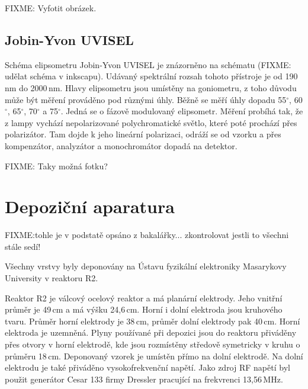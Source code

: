 FIXME: Vyfotit obrázek.


\subsection{Jobin-Yvon UVISEL}
Schéma elipsometru Jobin-Yvon UVISEL je znázorněno na schématu (FIXME: udělat schéma v inkscapu). Udávaný spektrální rozsah tohoto přístroje je od 190\,nm do 2000\,nm. Hlavy elipsometru jsou umístěny na goniometru, z toho důvodu může být měření prováděno pod různými úhly. Běžně se měří úhly dopadu 55$^\circ$, 60$^\circ$, 65$^\circ$, 70$^\circ$ a 75$^\circ$. Jedná se o fázově modulovaný elipsometr. Měření probíhá tak, že z lampy vychází nepolarizované polychromatické světlo, které poté prochází přes polarizátor. Tam dojde k jeho lineární polarizaci, odráží se od vzorku a přes kompenzátor, analyzátor a monochromátor dopadá na detektor.

FIXME: Taky možná fotku?


\section{Depoziční aparatura}
FIXME:tohle je v podstatě opsáno z bakalářky... zkontrolovat jestli to všechni stále sedí!

Všechny vrstvy byly deponovány na Ústavu fyzikální elektroniky Masarykovy University v reaktoru R2. 

Reaktor R2 je válcový ocelový reaktor a má planární elektrody. Jeho vnitřní průměr je 49\,cm a má výšku 24,6\,cm. Horní i dolní elektroda jsou kruhového tvaru. Průměr horní elektrody je 38\,cm, průměr dolní elektrody pak 40\,cm. Horní elektroda je uzemněná. Plyny používané při depozici jsou do reaktoru přiváděny přes otvory v horní elektrodě, kde jsou rozmístěny středově symetricky v kru\-hu o průměru 18\,cm. Deponovaný vzorek je umístěn přímo na dolní elektrodě. Na dolní elektrodu je také přiváděno vysokofrekvenční napětí. Jako zdroj RF napětí byl použit generátor Cesar 133 firmy Dressler pracující na frekvrenci 13,56\,MHz.

